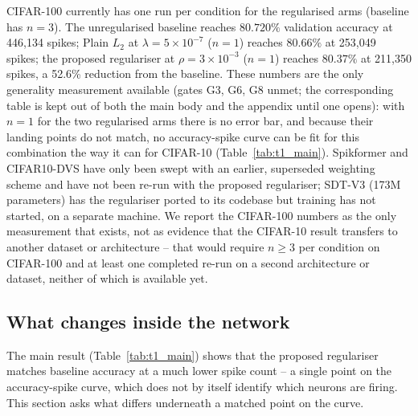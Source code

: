 
CIFAR-100 currently has one run per condition for the regularised arms
(baseline has $n=3$). The unregularised baseline reaches $80.720\%$
validation accuracy at 446,134 spikes; Plain $L_2$ at
$\lambda=5\times10^{-7}$ ($n=1$) reaches $80.66\%$ at 253,049 spikes; the
proposed regulariser at $\rho=3\times10^{-3}$ ($n=1$) reaches $80.37\%$ at
211,350 spikes, a 52.6\% reduction from the baseline. These numbers are the
only generality measurement available (gates G3, G6, G8 unmet; the
corresponding table is kept out of both the main body and the appendix
until one opens): with $n=1$ for the two regularised arms there is no
error bar, and because their landing points do not match, no
accuracy-spike curve can be fit for this combination the way it can for
CIFAR-10 (Table~\ref{tab:t1_main}). Spikformer and CIFAR10-DVS have only
been swept with an earlier, superseded weighting scheme and have not been
re-run with the proposed regulariser; SDT-V3 (173M parameters) has the
regulariser ported to its codebase but training has not started, on a
separate machine. We report the CIFAR-100 numbers as the only measurement
that exists, not as evidence that the CIFAR-10 result transfers to another
dataset or architecture -- that would require $n\geq3$ per condition on
CIFAR-100 and at least one completed re-run on a second architecture or
dataset, neither of which is available yet.


\subsection{What changes inside the network}
\label{sec:exp-analysis}

The main result (Table~\ref{tab:t1_main}) shows that the proposed
regulariser matches baseline accuracy at a much lower spike count -- a
single point on the accuracy-spike curve, which does not by itself
identify which neurons are firing. This section asks what differs
underneath a matched point on the curve.

